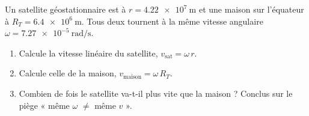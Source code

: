 \documentclass[11pt,a4paper]{article}
\begin{document}
\begin{exo}
Un satellite géostationnaire est à $r=\qty{4.22e7}{\metre}$ et une maison sur
l'équateur à $R_T=\qty{6.4e6}{\metre}$. Tous deux tournent à la même vitesse
angulaire $\omega=\qty{7.27e-5}{\radian\per\second}$.
\begin{enumerate}[label=\alph*)]
  \item Calcule la vitesse linéaire du satellite, $v_{\text{sat}}=\omega\,r$.
  \item Calcule celle de la maison, $v_{\text{maison}}=\omega\,R_T$.
  \item Combien de fois le satellite va-t-il plus vite que la maison ? Conclus sur le
        piège « même $\omega$ $\ne$ même $v$ ».
\end{enumerate}
\end{exo}
\end{document}
